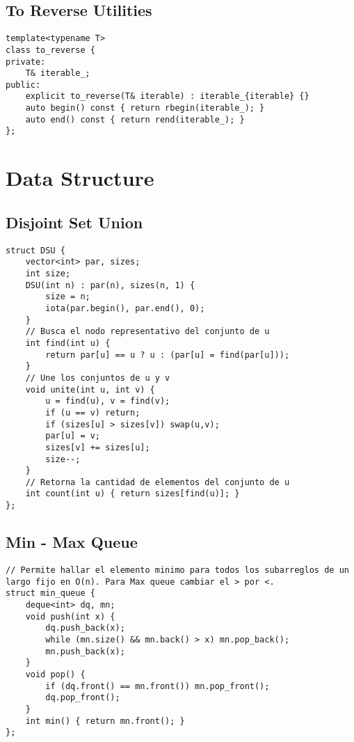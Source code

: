\documentclass[10pt,letterpaper,twocolumn,twosided]{article}
\begin{document}
\subsection{To Reverse Utilities}
\begin{lstlisting}
template<typename T>
class to_reverse {
private:
    T& iterable_;
public:
    explicit to_reverse(T& iterable) : iterable_{iterable} {}
    auto begin() const { return rbegin(iterable_); }
    auto end() const { return rend(iterable_); }
};
\end{lstlisting}


\section{Data Structure}

\subsection{Disjoint Set Union}
\begin{lstlisting}
struct DSU {
    vector<int> par, sizes;
    int size;
    DSU(int n) : par(n), sizes(n, 1) {
        size = n;
        iota(par.begin(), par.end(), 0);
    }
    // Busca el nodo representativo del conjunto de u
    int find(int u) {
        return par[u] == u ? u : (par[u] = find(par[u]));
    }
    // Une los conjuntos de u y v
    void unite(int u, int v) {
        u = find(u), v = find(v);
        if (u == v) return;
        if (sizes[u] > sizes[v]) swap(u,v);
        par[u] = v;
        sizes[v] += sizes[u];
        size--;
    }
    // Retorna la cantidad de elementos del conjunto de u
    int count(int u) { return sizes[find(u)]; }
};
\end{lstlisting}

\subsection{Min - Max Queue}
\begin{lstlisting}
// Permite hallar el elemento minimo para todos los subarreglos de un largo fijo en O(n). Para Max queue cambiar el > por <.
struct min_queue {
    deque<int> dq, mn;
    void push(int x) {
        dq.push_back(x);
        while (mn.size() && mn.back() > x) mn.pop_back();
        mn.push_back(x);
    }
    void pop() {
        if (dq.front() == mn.front()) mn.pop_front();
        dq.pop_front();
    }
    int min() { return mn.front(); }
};
\end{lstlisting}
\end{document}

